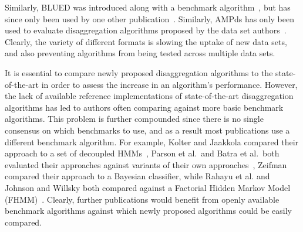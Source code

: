\documentclass{sig-alternate}
\newcommand{\bluecolor}[1]{\textcolor{blue}{#1}}
\begin{document}
Similarly, BLUED was introduced along with a benchmark algorithm~\cite{blued}, but has since only been used by one other publication~\cite{anderson_2012}. Similarly, AMPds has only been used to evaluate disaggregation algorithms proposed by the data set authors~\cite{ampds}. Clearly, the variety of different formats is slowing the uptake of new data sets, and also preventing algorithms from being tested across multiple data sets. 

It is essential to compare newly proposed disaggregation algorithms to the state-of-the-art in order to assess the increase in an algorithm's performance. However, the lack of available reference implementations of state-of-the-art disaggregation algorithms has led to authors often comparing against more basic benchmark algorithms. This problem is further compounded since there is no single consensus on which benchmarks to use, and as a result most publications use a different benchmark algorithm. For example, Kolter and Jaakkola compared their approach to a set of decoupled HMMs~\cite{kolter_2012}, Parson et al.\ and Batra et al.\ both evaluated their approaches against variants of their own approaches~\cite{parson_2012,batra_2013}, Zeifman compared their approach to a Bayesian classifier, while Rahayu et al. and Johnson and Willsky both compared against a Factorial Hidden Markov Model (FHMM)~\cite{rahayu_2012,johnson_2013}. Clearly, further publications would benefit from openly available benchmark algorithms against which newly proposed algorithms could be easily compared.

\end{document}
